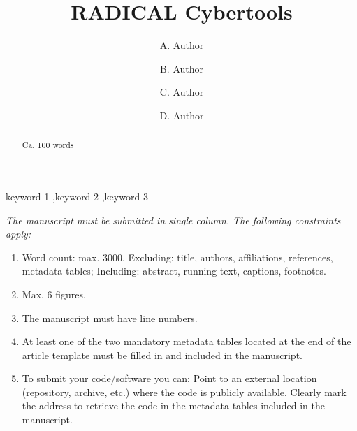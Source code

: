 \documentclass[preprint,12pt, a4paper]{elsarticle}
\begin{document}
\begin{frontmatter}

\title{RADICAL Cybertools}

\author{A. Author}
\address{Your institute, some address}

\author{B. Author}
\address{Your institute, some address}

\author{C. Author}
\address{Your institute, some address}

\author{D. Author}
\address{Your institute, some address}

\begin{abstract}
Ca. 100 words
\end{abstract}

\begin{keyword}
keyword 1 \sep keyword 2 \sep keyword 3



\end{keyword}

\end{frontmatter}

\linenumbers{}

{\em The manuscript must be submitted in single column. The following constraints apply:
\begin{enumerate}
  \item Word count: max. 3000. Excluding: title, authors, affiliations,
        references, metadata tables; Including: abstract, running text,
        captions, footnotes.
  \item Max. 6 figures.
  \item The manuscript must have line numbers.
  \item At least one of the two mandatory metadata tables located at the end
        of the article template must be filled in and included in the
        manuscript.
  \item To submit your code/software you can: Point to an external location
        (repository, archive, etc.) where the code is publicly available.
        Clearly mark the address to retrieve the code in the metadata tables
        included in the manuscript.
\end{enumerate}}


\end{document}
